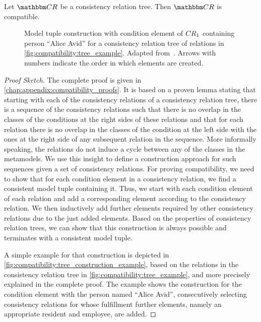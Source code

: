 \begin{theorem} \label{theorem:treecompatibility}
    Let $\consistencyrelationset{CR}$ be a consistency relation tree. Then $\consistencyrelationset{CR}$ is compatible.
\end{theorem}

\begin{figure}
    \centering
    
    \caption[Construction of a model tuple for a consistency relation tree]{Model tuple construction with condition element of $\consistencyrelation{CR}{1}$ containing person \enquote{Alice Avid} for a consistency relation tree of relations in \autoref{fig:compatibility:tree_example}. Adapted from~. Arrows with numbers indicate the order in which elements are created.}
    \label{fig:compatibility:tree_construction_example}
\end{figure}

\begin{proof}[Proof Sketch]
    The complete proof is given in \autoref{chap:appendix:compatibility_proofs}.
    It is based on a proven lemma stating that starting with each of the consistency relations of a consistency relation tree, there is a sequence of the consistency relations such that there is no overlap in the classes of the conditions at the right sides of these relations and that for each relation there is no overlap in the classes of the condition at the left side with the ones at the right side of any subsequent relation in the sequence.
    More informally speaking, the relations do not induce a cycle between any of the classes in the metamodels.
    We use this insight to define a construction approach for such sequences given a set of consistency 
    relations.
    For proving compatibility, we need to show that for each condition element in a consistency relation, we find a consistent model tuple containing it.
    Thus, we start with each condition element of each relation and add a corresponding element according to the consistency relation.
    We then inductively add further elements required by other consistency relations due to the just added elements.
    Based on the properties of consistency relation trees, we can show that this construction is always possible and terminates with a consistent model tuple.
    
    A simple example for that construction is depicted in \autoref{fig:compatibility:tree_construction_example}, based on the relations in the consistency relation tree in \autoref{fig:compatibility:tree_example}, and more precisely explained in the complete proof.
    The example shows the construction for the condition element with the person named \enquote{Alice Avid}, consecutively selecting consistency relations for whose fulfillment further elements, namely an appropriate resident and employee, are added.
\end{proof}

